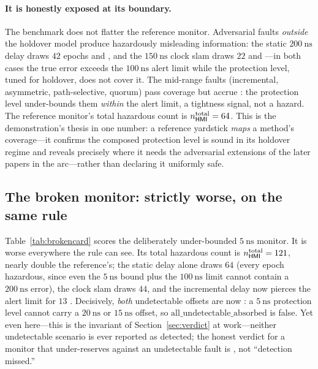 \paragraph{It is honestly exposed at its boundary.} The benchmark does not flatter
the reference monitor. Adversarial faults \emph{outside} the holdover model produce
hazardously misleading information: the static $\SI{200}{\nano\second}$ delay draws
$42$ \HMI{} epochs and \CovFail{}, and the $\SI{150}{\nano\second}$ clock slam
draws $22$ \HMI{} and \CovFail{}---in both cases the true error exceeds the
$\SI{100}{\nano\second}$ alert limit while the protection level, tuned for holdover,
does not cover it. The mid-range faults (incremental, asymmetric, path-selective,
quorum) pass coverage but accrue \MI{}: the protection level under-bounds them
\emph{within} the alert limit, a tightness signal, not a hazard. The reference
monitor's total hazardous count is $n_{\textsf{HMI}{}}^{\text{total}}=64$. This is the
demonstration's thesis in one number: a reference yardstick \emph{maps} a method's
coverage---it confirms the composed protection level is sound in its holdover
regime and reveals precisely where it needs the adversarial extensions of the later
papers in the arc---rather than declaring it uniformly safe.

\subsection{The broken monitor: strictly worse, on the same rule}
\label{sec:demobroken}

Table~\ref{tab:brokencard} scores the deliberately under-bounded
$\SI{5}{\nano\second}$ monitor. It is worse everywhere the rule can see. Its total
hazardous count is $n_{\textsf{HMI}{}}^{\text{total}}=121$, nearly double the reference's;
the static delay alone draws $64$ \HMI{} (every epoch hazardous, since even the
$\SI{5}{\nano\second}$ bound plus the $\SI{100}{\nano\second}$ limit cannot contain
a $\SI{200}{\nano\second}$ error), the clock slam draws $44$, and the incremental
delay now pierces the alert limit for $13$ \HMI{}. Decisively, \emph{both}
undetectable offsets are now \Unabsorbed{}: a $\SI{5}{\nano\second}$ protection
level cannot carry a $\SI{20}{\nano\second}$ or $\SI{15}{\nano\second}$ offset, so
$\mathrm{all\_undetectable\_absorbed}$ is false. Yet even here---this is the
invariant of Section~\ref{sec:verdict} at work---neither undetectable scenario is
ever reported as detected; the honest verdict for a monitor that under-reserves
against an undetectable fault is \Unabsorbed{}, not ``detection missed.''

